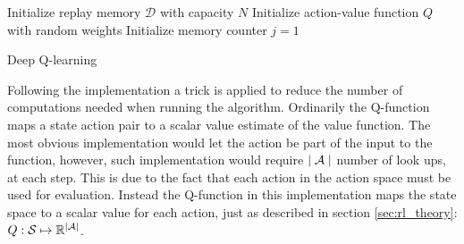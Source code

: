 \begin{algorithm}[H]
\SetAlgoLined
 Initialize replay memory $\mathcal{D}$ with capacity $N$\;
 Initialize action-value function $Q$ with random weights\;
 Initialize memory counter $j=1$\;
\caption{Deep Q-learning}
\label{alg:dqlearning}
\end{algorithm}

Following the implementation \textcite{mnih_playing_2013} a trick is applied to reduce the number of computations needed when running the algorithm. Ordinarily the Q-function maps a state action pair to a scalar value estimate of the value function. The most obvious implementation would let the action be part of the input to the function, however, such implementation would require $\mid \mathcal{A} \mid$ number of look ups, at each step. This is due to the fact that each action in the action space must be used for evaluation. Instead the Q-function in this implementation maps the state space to a scalar value for each action, just as described in section \ref{sec:rl_theory}: $Q: \mathcal{S} \mapsto \mathbb{R}^{\mid \mathcal{A} \mid}$. 

